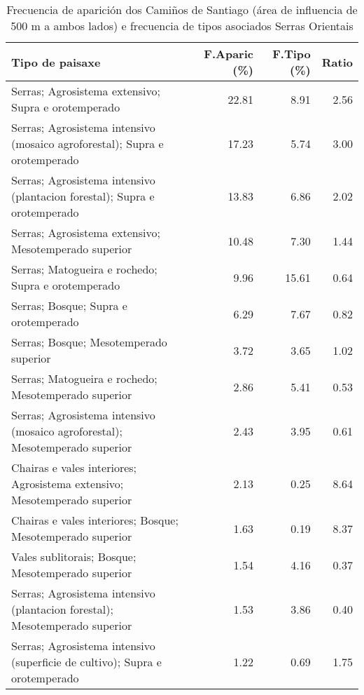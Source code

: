 \begin{table}[p]
\centering
\caption{Frecuencia de aparición dos Camiños de Santiago (área de influencia de 500 m a ambos lados) e frecuencia de tipos asociados Serras Orientais} 
\label{vcamino5}
\begin{tabular}{lrrr}
  \hline
Tipo de paisaxe & F.Aparic (\%) & F.Tipo (\%) & Ratio \\ 
  \hline
Serras; Agrosistema extensivo; Supra e orotemperado & 22.81 & 8.91 & 2.56 \\ 
  Serras; Agrosistema intensivo (mosaico agroforestal); Supra e orotemperado & 17.23 & 5.74 & 3.00 \\ 
  Serras; Agrosistema intensivo (plantacion forestal); Supra e orotemperado & 13.83 & 6.86 & 2.02 \\ 
  Serras; Agrosistema extensivo; Mesotemperado superior & 10.48 & 7.30 & 1.44 \\ 
  Serras; Matogueira e rochedo; Supra e orotemperado & 9.96 & 15.61 & 0.64 \\ 
  Serras; Bosque; Supra e orotemperado & 6.29 & 7.67 & 0.82 \\ 
  Serras; Bosque; Mesotemperado superior & 3.72 & 3.65 & 1.02 \\ 
  Serras; Matogueira e rochedo; Mesotemperado superior & 2.86 & 5.41 & 0.53 \\ 
  Serras; Agrosistema intensivo (mosaico agroforestal); Mesotemperado superior & 2.43 & 3.95 & 0.61 \\ 
  Chairas e vales interiores; Agrosistema extensivo; Mesotemperado superior & 2.13 & 0.25 & 8.64 \\ 
  Chairas e vales interiores; Bosque; Mesotemperado superior & 1.63 & 0.19 & 8.37 \\ 
  Vales sublitorais; Bosque; Mesotemperado superior & 1.54 & 4.16 & 0.37 \\ 
  Serras; Agrosistema intensivo (plantacion forestal); Mesotemperado superior & 1.53 & 3.86 & 0.40 \\ 
  Serras; Agrosistema intensivo (superficie de cultivo); Supra e orotemperado & 1.22 & 0.69 & 1.75 \\ 
   \hline
\end{tabular}
\end{table}
